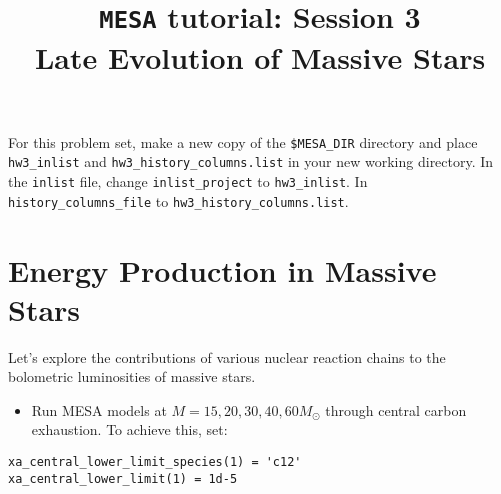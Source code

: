 \documentclass[11pt,a4paper]{article}
\begin{document}
\title{
    \textbf{\texttt{MESA} tutorial:  Session 3} \\
    \textbf{\Large Late Evolution of Massive Stars}
}
\date{}
\maketitle
\vspace{-1cm}


For this problem set, make a new copy of the \texttt{\$MESA\_DIR} 
directory and place \texttt{hw3\_inlist} and \texttt{hw3\_history\_columns.list} in your new working directory.
In the \texttt{inlist} file, change \texttt{inlist\_project} to \texttt{hw3\_inlist}. In  \texttt{history\_columns\_file} to \texttt{hw3\_history\_columns.list}.


\section{Energy Production in Massive Stars}

Let's explore the contributions of various nuclear reaction chains to the bolometric luminosities of massive stars.

\begin{itemize}
    \item Run MESA models at $M = 15, 20, 30, 40, 60 M_\odot$ through central carbon exhaustion.
    To achieve this, set:
\end{itemize}
    \begin{lstlisting}
xa_central_lower_limit_species(1) = 'c12'
xa_central_lower_limit(1) = 1d-5
    \end{lstlisting}
\end{document}
